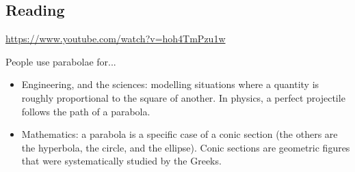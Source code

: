 



\subsection*{Reading}
\begin{center}
\begin{tcolorbox}[width=0.8\textwidth,colback={white},title={\textbf{Go and watch...}},colbacktitle=black,coltitle=white]
  \textcolor{black}{\url{https://www.youtube.com/watch?v=hoh4TmPzu1w}}
\end{tcolorbox}
\end{center}

\begin{center}
\begin{tcolorbox}[width=0.8\textwidth,colback={white},title={\textbf{What's it good for?}},colbacktitle=MidnightBlue,coltitle=white]
  People use parabolae for...
  \begin{itemize}
    \item Engineering, and the sciences: modelling situations where a quantity is roughly proportional to the square of another. In physics,
          a perfect projectile follows the path of a parabola.
    \item Mathematics: a parabola is a specific case of a conic section (the others are the hyperbola, the circle, and the ellipse). Conic
          sections are geometric figures that were systematically studied by the Greeks.
  \end{itemize}
\end{tcolorbox}
\end{center}


